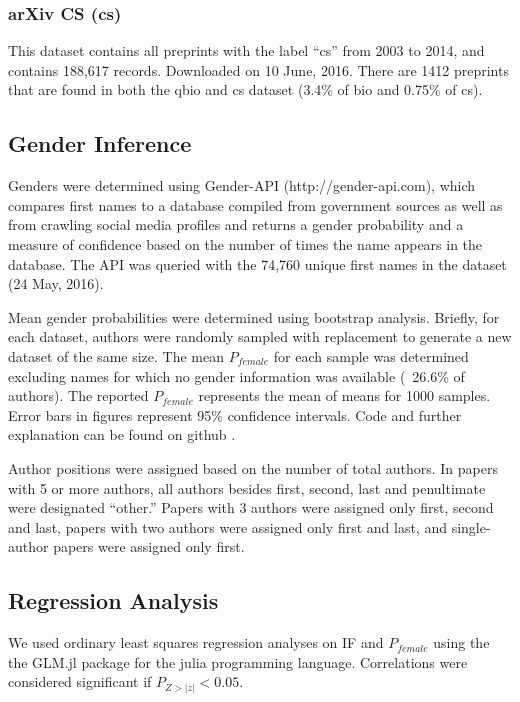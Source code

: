 \documentclass[10pt,letterpaper]{article}
\begin{document}
\begin{flushleft}
\subsubsection*{arXiv CS (cs)}
This dataset \cite{Bonham2016a} contains all preprints with the label “cs” from 2003 to 2014, and contains 188,617 records. Downloaded on 10 June, 2016. There are 1412 preprints that are found in both the qbio and cs dataset (3.4\% of bio and 0.75\% of cs).

\subsection*{Gender Inference}
Genders were determined using Gender-API (http://gender-api.com), which compares first names to a database compiled from government sources as well as from crawling social media profiles and returns a gender probability and a measure of confidence based on the number of times the name appears in the database. The API was queried with the 74,760 unique first names in the dataset (24 May, 2016).

Mean gender probabilities were determined using bootstrap analysis. Briefly, for each dataset, authors were randomly sampled with replacement to generate a new dataset of the same size. The mean $P_{female}$ for each sample was determined excluding names for which no gender information was available (~26.6\% of authors). The reported $P_{female}$ represents the mean of means for 1000 samples. Error bars in figures represent 95\% confidence intervals. Code and further explanation can be found on github \cite{Bonham2016b}.

Author positions were assigned based on the number of total authors. In papers with 5 or more authors, all authors besides first, second, last and penultimate were designated “other.” Papers with 3 authors were assigned only first, second and last, papers with two authors were assigned only first and last, and single-author papers were assigned only first.

\subsection*{Regression Analysis}
We used ordinary least squares regression analyses on IF and $P_{female}$ using the the GLM.jl package for the julia programming language. Correlations were considered significant if $P_{Z > |z|} < 0.05$.


\begin{thebibliography}{10}


\end{thebibliography}
\end{flushleft}
\end{document}
